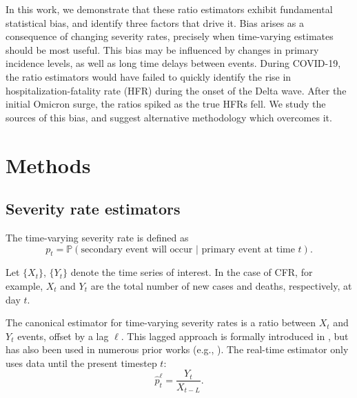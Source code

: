 \documentclass{article}
\begin{document}
In this work, we demonstrate that these ratio estimators exhibit fundamental statistical bias, and identify three factors that drive it. Bias arises as a consequence of changing severity rates, precisely when time-varying estimates should be most useful. This bias may be influenced by changes in primary incidence levels, as well as long time delays between events. During COVID-19, the ratio estimators would have failed to quickly identify the rise in hospitalization-fatality rate (HFR) during the onset of the Delta wave. After the initial Omicron surge, the ratios spiked as the true HFRs fell. We study the sources of this bias, and suggest alternative methodology which overcomes it.


\section{Methods}
\label{sec:methods}
\subsection{Severity rate estimators}

The time-varying severity rate is defined as
\begin{equation}\label{eq:severity}
    p_t = \mathbb{P}(\text{secondary event will occur } \vert \text{ primary event at time }t).
\end{equation}

Let $\{X_t\}$, $\{Y_t\}$ denote the time series of interest. In the case of CFR, for example, $X_t$ and $Y_t$ are the total number of new cases and deaths, respectively, at day $t$. 

The canonical estimator for time-varying severity rates is a ratio between $X_t$ and $Y_t$ events, offset by a lag $\ell$. This lagged approach is formally introduced in \citet{thomas2021estimating}, but has also been used in numerous prior works (e.g., \citealp{germany,horita2022global,timevar_ifr,yuan2020monitoring,LIU2023100350,atlantic,wsj}). The real-time estimator only uses data until the present timestep $t$: 
\begin{equation}\label{eq:lagged}
    \hat{p}_t^\ell = \frac{Y_t}{X_{t-L}}.
\end{equation}
\end{document}

